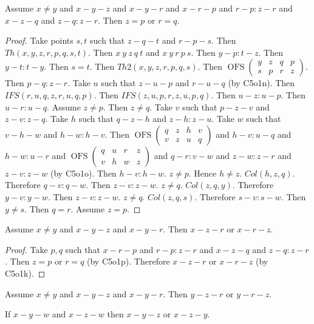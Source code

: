 \documentclass{article}
\newcommand{\OFS}[8]{\operatorname{OFS}
\left(\begin{smallmatrix}%
#1 & #2 & #3 & #4 \\
#5 & #6 & #7 & #8
\end{smallmatrix}\right)%
}
\begin{document}
  \begin{forthel}
    \begin{lemma}[C5o1p]
      Assume $x \neq y$ and $x-y-z$ and $x-y-r$ and $x-r-p$ and $r-p : z-r$ and $x-z-q$ and $z-q : z-r$. Then $z = p$ or $r = q$.
    \end{lemma}
    \begin{proof}
    	Take points $s,t$ such that $z-q-t$ and $r-p-s$.
    	Then $Th(x,y,z,r,p,q,s,t)$.
    	Then $x~y~z~q~t$ and $x~y~r~p~s$.
    	Then $y-p : t-z$.
    	Then $y-t : t-y$.
    	Then $s = t$.
    	Then $Th2(x,y,z,r,p,q,s)$.
    	Then $\OFS{y}{z}{q}{p}{s}{p}{r}{z}$.
    	Then $p-q : z-r$.
    	Take $u$ such that $z-u-p$ and $r-u-q$ (by C5o1n).
    	Then $IFS(r,u,q,z,r,u,q,p)$.
    	Then $IFS(z,u,p,r,z,u,p,q)$.
    	Then $u-z : u-p$.
    	Then $u-r : u-q$.
    	Assume $z \neq p$. Then $z \neq q$.
    		Take $v$ such that $p-z-v$ and $z-v : z-q$.
    		Take $h$ such that $q-z-h$ and $z-h : z-u$.
    		Take $w$ such that $v-h-w$ and $h-w : h-v$.
        Then $\OFS{q}{z}{h}{v}{v}{z}{u}{q}$
        and $h-v : u-q$ and $h-w : u-r$
        and $\OFS{q}{u}{r}{z}{v}{h}{w}{z}$
        and $q-r : v-w$ and $z-w : z-r$ and $z-v : z-w$ (by C5o1o).
    		Then $h-v : h-w$. $z \neq p$. Hence $h \neq z$. $Col(h,z,q)$. Therefore $q-v : q-w$.
    		Then $z-v : z-w$. $z \neq q$. $Col(z,q,y)$. Therefore $y-v : y-w$.
    		Then $z-v : z-w$. $z \neq q$. $Col(z,q,s)$. Therefore $s-v : s-w$.
    		Then $y \neq s$.
    		Then $q = r$.
    	Assume $z = p$.
    \end{proof}

    \begin{lemma}[D5o1]
      Assume $x \neq y$ and $x-y-z$ and $x-y-r$. Then $x-z-r$ or $x-r-z$.
    \end{lemma}
    \begin{proof}
    	Take $p,q$ such that $x-r-p$ and $r-p : z-r$ and $x-z-q$ and $z-q : z-r$. Then $z = p$ or $r = q$ (by C5o1p). Therefore $x-z-r$ or $x-r-z$ (by C5o1k).
    \end{proof}

    \begin{lemma}[D5o2]
      Assume $x \neq y$ and $x-y-z$ and $x-y-r$. Then $y-z-r$ or $y-r-z$.
    \end{lemma}

    \begin{theorem}[D5o3]
      If $x-y-w$ and $x-z-w$ then $x-y-z$ or $x-z-y$.
    \end{theorem}
  \end{forthel}
\end{document}
